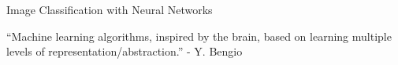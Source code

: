\documentclass[11pt,compress,t,notes=noshow, xcolor=table]{beamer}
\begin{document}
\begin{frame}{Image Classification with Neural Networks}
  
``Machine learning algorithms, inspired by the brain, based on learning multiple levels of representation/abstraction.''   
- Y. Bengio
  
\begin{overlayarea}{\textwidth}{\textheight}


\end{overlayarea}
\end{frame}
\end{document}

